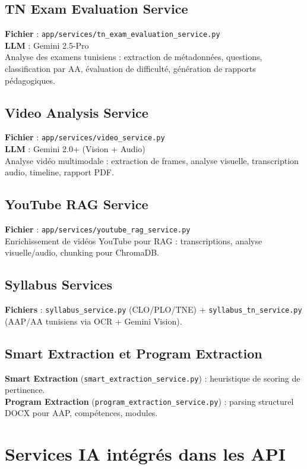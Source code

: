 \documentclass[12pt,a4paper]{article}
\begin{document}
\subsection{TN Exam Evaluation Service}
\textbf{Fichier} : \texttt{app/services/tn\_exam\_evaluation\_service.py} \\
\textbf{LLM} : Gemini 2.5-Pro \\
Analyse des examens tunisiens : extraction de métadonnées, questions, classification par AA, évaluation de difficulté, génération de rapports pédagogiques.

\subsection{Video Analysis Service}
\textbf{Fichier} : \texttt{app/services/video\_service.py} \\
\textbf{LLM} : Gemini 2.0+ (Vision + Audio) \\
Analyse vidéo multimodale : extraction de frames, analyse visuelle, transcription audio, timeline, rapport PDF.

\subsection{YouTube RAG Service}
\textbf{Fichier} : \texttt{app/services/youtube\_rag\_service.py} \\
Enrichissement de vidéos YouTube pour RAG : transcriptions, analyse visuelle/audio, chunking pour ChromaDB.

\subsection{Syllabus Services}
\textbf{Fichiers} : \texttt{syllabus\_service.py} (CLO/PLO/TNE) + \texttt{syllabus\_tn\_service.py} (AAP/AA tunisiens via OCR + Gemini Vision).

\subsection{Smart Extraction et Program Extraction}
\textbf{Smart Extraction} (\texttt{smart\_extraction\_service.py}) : heuristique de scoring de pertinence. \\
\textbf{Program Extraction} (\texttt{program\_extraction\_service.py}) : parsing structurel DOCX pour AAP, compétences, modules.

\section{Services IA intégrés dans les API}
\end{document}

